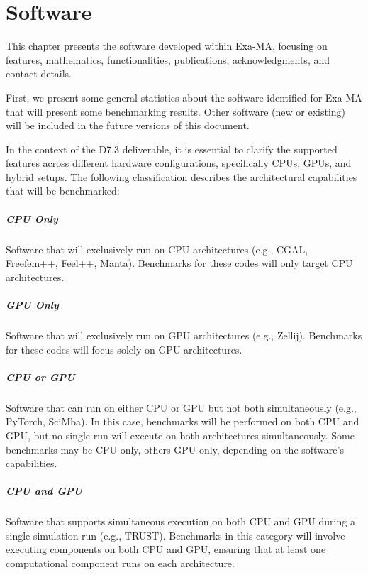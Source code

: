 \clearpage
\chapter{Software}
\label{chap:software}

This chapter presents the software developed within Exa-MA, focusing on features, mathematics, functionalities, publications, acknowledgments, and contact details.

First, we present some general statistics about the software identified for Exa-MA that will present some benchmarking results. 
Other software (new or existing) will be included in the future versions of this document.

In the context of the D7.3 deliverable, it is essential to clarify the supported features across different hardware configurations, specifically CPUs, GPUs, and hybrid setups. 
The following classification describes the architectural capabilities that will be benchmarked:

\paragraph{CPU Only}
Software that will exclusively run on CPU architectures (e.g., CGAL, Freefem++, Feel++, Manta). Benchmarks for these codes will only target CPU architectures.

\paragraph{GPU Only}
Software that will exclusively run on GPU architectures (e.g., Zellij). Benchmarks for these codes will focus solely on GPU architectures.

\paragraph{CPU or GPU}
Software that can run on either CPU or GPU but not both simultaneously (e.g., PyTorch, SciMba). In this case, benchmarks will be performed on both CPU and GPU, but no single run will execute on both architectures simultaneously. Some benchmarks may be CPU-only, others GPU-only, depending on the software's capabilities.

\paragraph{CPU and GPU}
Software that supports simultaneous execution on both CPU and GPU during a single simulation run (e.g., TRUST). Benchmarks in this category will involve executing components on both CPU and GPU, ensuring that at least one computational component runs on each architecture.

